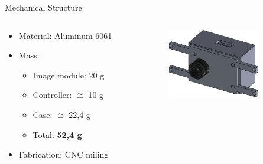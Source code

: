 
\begin{frame}{Mechanical Structure}

    \begin{columns}[t]
        \begin{column}[t]{0.5\textwidth}
            \begin{itemize}
                \item Material: Aluminum 6061
                \vspace{0.3cm}
                \item Mass:
                    \begin{itemize}
                        \item Image module: 20 g
                        \vspace{0.2cm}
                        \item Controller: $\cong$ 10 g
                        \vspace{0.2cm}
                        \item Case: $\cong$ 22,4 g
                        \vspace{0.2cm}
                        \item Total: \textbf{52,4 g}
                    \end{itemize}
                \vspace{0.3cm}
                \item Fabrication: CNC miling
            \end{itemize}
        \end{column}
        \begin{column}[t]{0.5\textwidth}
        \vspace{0.5cm}
            \begin{figure}[!ht]
                \begin{center}
                    \includegraphics[width=4cm]{figures/slcam-overview.png}
                \end{center}
            \end{figure}
        \end{column}
    \end{columns}

\end{frame}

